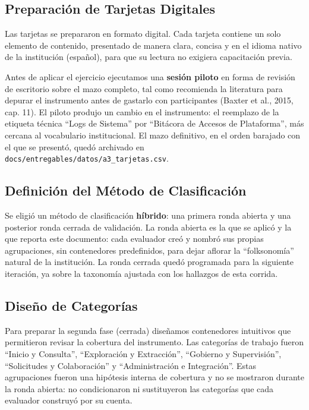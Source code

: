 \subsection{Preparación de Tarjetas Digitales}
Las tarjetas se prepararon en formato digital. Cada tarjeta contiene un solo elemento de contenido, presentado de manera clara, concisa y en el idioma nativo de la institución (español), para que su lectura no exigiera capacitación previa.

Antes de aplicar el ejercicio ejecutamos una \textbf{sesión piloto} en forma de revisión de escritorio sobre el mazo completo, tal como recomienda la literatura para depurar el instrumento antes de gastarlo con participantes (Baxter et al., 2015, cap. 11). El piloto produjo un cambio en el instrumento: el reemplazo de la etiqueta técnica ``Logs de Sistema'' por ``Bitácora de Accesos de Plataforma'', más cercana al vocabulario institucional. El mazo definitivo, en el orden barajado con el que se presentó, quedó archivado en \texttt{docs/entregables/datos/a3\_tarjetas.csv}.

\subsection{Definición del Método de Clasificación}
Se eligió un método de clasificación \textbf{híbrido}: una primera ronda abierta y una posterior ronda cerrada de validación. La ronda abierta es la que se aplicó y la que reporta este documento: cada evaluador creó y nombró sus propias agrupaciones, sin contenedores predefinidos, para dejar aflorar la ``folksonomía'' natural de la institución. La ronda cerrada quedó programada para la siguiente iteración, ya sobre la taxonomía ajustada con los hallazgos de esta corrida.

\subsection{Diseño de Categorías}
Para preparar la segunda fase (cerrada) diseñamos contenedores intuitivos que permitieron revisar la cobertura del instrumento. Las categorías de trabajo fueron ``Inicio y Consulta'', ``Exploración y Extracción'', ``Gobierno y Supervisión'', ``Solicitudes y Colaboración'' y ``Administración e Integración''. Estas agrupaciones fueron una hipótesis interna de cobertura y no se mostraron durante la ronda abierta: no condicionaron ni sustituyeron las categorías que cada evaluador construyó por su cuenta.

